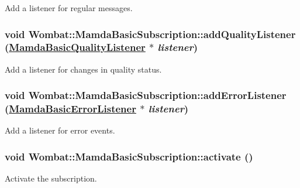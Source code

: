 Add a listener for regular messages. 

\hypertarget{classWombat_1_1MamdaBasicSubscription_2144d4ffbedc27f3977fb6d3f3b22177}{
\subsubsection[addQualityListener]{\setlength{\rightskip}{0pt plus 5cm}void Wombat::Mamda\-Basic\-Subscription::add\-Quality\-Listener (\hyperlink{classWombat_1_1MamdaBasicQualityListener}{Mamda\-Basic\-Quality\-Listener} $\ast$ {\em listener})}}
\label{classWombat_1_1MamdaBasicSubscription_2144d4ffbedc27f3977fb6d3f3b22177}


Add a listener for changes in quality status. 

\hypertarget{classWombat_1_1MamdaBasicSubscription_603860e2a70d52d81b58c1144d917134}{
\subsubsection[addErrorListener]{\setlength{\rightskip}{0pt plus 5cm}void Wombat::Mamda\-Basic\-Subscription::add\-Error\-Listener (\hyperlink{classWombat_1_1MamdaBasicErrorListener}{Mamda\-Basic\-Error\-Listener} $\ast$ {\em listener})}}
\label{classWombat_1_1MamdaBasicSubscription_603860e2a70d52d81b58c1144d917134}


Add a listener for error events. 

\hypertarget{classWombat_1_1MamdaBasicSubscription_704ba0b8ec4c027d0357d3e482314605}{
\subsubsection[activate]{\setlength{\rightskip}{0pt plus 5cm}void Wombat::Mamda\-Basic\-Subscription::activate ()}}
\label{classWombat_1_1MamdaBasicSubscription_704ba0b8ec4c027d0357d3e482314605}


Activate the subscription. 

